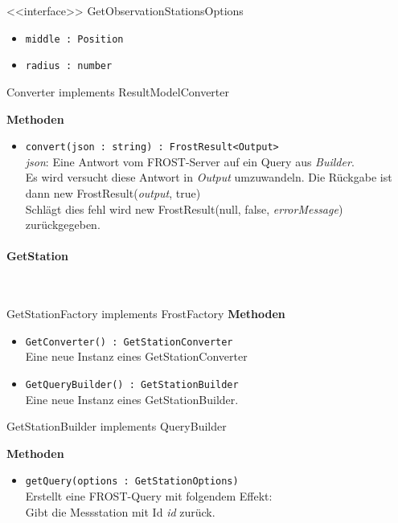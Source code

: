 \begin{Class}{<<interface>> GetObservationStationsOptions}
    \begin{itemize}
        \item \texttt{middle : Position}
        \item \texttt{radius : number}
    \end{itemize}
\end{Class}

\begin{Class}{Converter implements ResultModelConverter}

    \textbf{Methoden}
    \begin{itemize}
        \item \texttt{convert(json : string) : FrostResult<Output>}
        \\ \emph{json}: Eine Antwort vom FROST-Server auf ein Query aus \emph{Builder}.
        \\ Es wird versucht diese Antwort in \emph{Output} umzuwandeln.
        Die Rückgabe ist dann new FrostResult(\emph{output}, true)
        \\ Schlägt dies fehl wird new FrostResult(null, false, \emph{errorMessage}) zurückgegeben.
    \end{itemize}
\end{Class}

\paragraph{GetStation}\mbox{}\\

\begin{Class}{GetStationFactory implements FrostFactory}
    \textbf{Methoden}
    \begin{itemize}
        \item \texttt{GetConverter() : GetStationConverter}
        \\ Eine neue Instanz eines GetStationConverter
        \item \texttt{GetQueryBuilder() : GetStationBuilder}
        \\ Eine neue Instanz eines GetStationBuilder.
    \end{itemize}
\end{Class}

\begin{Class}{GetStationBuilder implements QueryBuilder}

    \textbf{Methoden}
    \begin{itemize}
        \item \texttt{getQuery(options : GetStationOptions)}
        \\ Erstellt eine FROST-Query mit folgendem Effekt:
        \\ Gibt die Messstation mit Id \emph{id} zurück.
    \end{itemize}
\end{Class}

